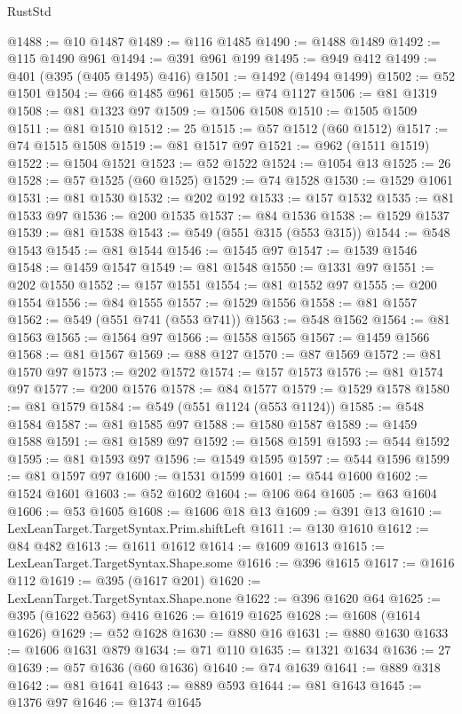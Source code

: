 \begin{lexlean}{RustStd}
\begin{coremodule}
@1488 := @10 @1487
@1489 := @116 @1485
@1490 := @1488 @1489
@1492 := @115 @1490 @961
@1494 := @391 @961 @199
@1495 := @949 @412
@1499 := @401 (@395 (@405 @1495) @416)
@1501 := @1492 (@1494 @1499)
@1502 := @52 @1501
@1504 := @66 @1485 @961
@1505 := @74 @1127
@1506 := @81 @1319
@1508 := @81 @1323 @97
@1509 := @1506 @1508
@1510 := @1505 @1509
@1511 := @81 @1510
@1512 := 25
@1515 := @57 @1512 (@60 @1512)
@1517 := @74 @1515 @1508
@1519 := @81 @1517 @97
@1521 := @962 (@1511 @1519)
@1522 := @1504 @1521
@1523 := @52 @1522
@1524 := @1054 @13
@1525 := 26
@1528 := @57 @1525 (@60 @1525)
@1529 := @74 @1528
@1530 := @1529 @1061
@1531 := @81 @1530
@1532 := @202 @192
@1533 := @157 @1532
@1535 := @81 @1533 @97
@1536 := @200 @1535
@1537 := @84 @1536
@1538 := @1529 @1537
@1539 := @81 @1538
@1543 := @549 (@551 @315 (@553 @315))
@1544 := @548 @1543
@1545 := @81 @1544
@1546 := @1545 @97
@1547 := @1539 @1546
@1548 := @1459 @1547
@1549 := @81 @1548
@1550 := @1331 @97
@1551 := @202 @1550
@1552 := @157 @1551
@1554 := @81 @1552 @97
@1555 := @200 @1554
@1556 := @84 @1555
@1557 := @1529 @1556
@1558 := @81 @1557
@1562 := @549 (@551 @741 (@553 @741))
@1563 := @548 @1562
@1564 := @81 @1563
@1565 := @1564 @97
@1566 := @1558 @1565
@1567 := @1459 @1566
@1568 := @81 @1567
@1569 := @88 @127
@1570 := @87 @1569
@1572 := @81 @1570 @97
@1573 := @202 @1572
@1574 := @157 @1573
@1576 := @81 @1574 @97
@1577 := @200 @1576
@1578 := @84 @1577
@1579 := @1529 @1578
@1580 := @81 @1579
@1584 := @549 (@551 @1124 (@553 @1124))
@1585 := @548 @1584
@1587 := @81 @1585 @97
@1588 := @1580 @1587
@1589 := @1459 @1588
@1591 := @81 @1589 @97
@1592 := @1568 @1591
@1593 := @544 @1592
@1595 := @81 @1593 @97
@1596 := @1549 @1595
@1597 := @544 @1596
@1599 := @81 @1597 @97
@1600 := @1531 @1599
@1601 := @544 @1600
@1602 := @1524 @1601
@1603 := @52 @1602
@1604 := @106 @64
@1605 := @63 @1604
@1606 := @53 @1605
@1608 := @1606 @18 @13
@1609 := @391 @13
@1610 := LexLeanTarget.TargetSyntax.Prim.shiftLeft
@1611 := @130 @1610
@1612 := @84 @482
@1613 := @1611 @1612
@1614 := @1609 @1613
@1615 := LexLeanTarget.TargetSyntax.Shape.some
@1616 := @396 @1615
@1617 := @1616 @112
@1619 := @395 (@1617 @201)
@1620 := LexLeanTarget.TargetSyntax.Shape.none
@1622 := @396 @1620 @64
@1625 := @395 (@1622 @563) @416
@1626 := @1619 @1625
@1628 := @1608 (@1614 @1626)
@1629 := @52 @1628
@1630 := @880 @16
@1631 := @880 @1630
@1633 := @1606 @1631 @879
@1634 := @71 @110
@1635 := @1321 @1634
@1636 := 27
@1639 := @57 @1636 (@60 @1636)
@1640 := @74 @1639
@1641 := @889 @318
@1642 := @81 @1641
@1643 := @889 @593
@1644 := @81 @1643
@1645 := @1376 @97
@1646 := @1374 @1645

\end{coremodule}
\end{lexlean}
